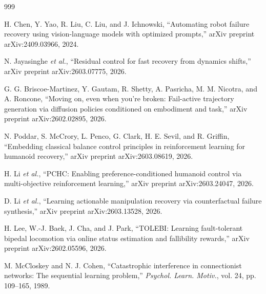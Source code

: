 \documentclass[11pt,a4paper]{article}
\begin{document}
\begin{thebibliography}{999}

H. Chen, Y. Yao, R. Liu, C. Liu, and J. Ichnowski, ``Automating robot failure recovery using vision-language models with optimized prompts,'' arXiv preprint arXiv:2409.03966, 2024.




N. Jayasinghe \textit{et al.}, ``Residual control for fast recovery from dynamics shifts,'' arXiv preprint arXiv:2603.07775, 2026.




G. G. Briscoe-Martinez, Y. Gautam, R. Shetty, A. Pasricha, M. M. Nicotra, and A. Roncone, ``Moving on, even when you're broken: Fail-active trajectory generation via diffusion policies conditioned on embodiment and task,'' arXiv preprint arXiv:2602.02895, 2026.




N. Poddar, S. McCrory, L. Penco, G. Clark, H. E. Sevil, and R. Griffin, ``Embedding classical balance control principles in reinforcement learning for humanoid recovery,'' arXiv preprint arXiv:2603.08619, 2026.




H. Li \textit{et al.}, ``{PCHC}: Enabling preference-conditioned humanoid control via multi-objective reinforcement learning,'' arXiv preprint arXiv:2603.24047, 2026.




D. Li \textit{et al.}, ``Learning actionable manipulation recovery via counterfactual failure synthesis,'' arXiv preprint arXiv:2603.13528, 2026.




H. Lee, W.-J. Baek, J. Cha, and J. Park, ``{TOLEBI}: Learning fault-tolerant bipedal locomotion via online status estimation and fallibility rewards,'' arXiv preprint arXiv:2602.05596, 2026.




M. McCloskey and N. J. Cohen, ``Catastrophic interference in connectionist networks: The sequential learning problem,'' \textit{Psychol. Learn. Motiv.}, vol. 24, pp. 109--165, 1989.




\end{thebibliography}
\end{document}
